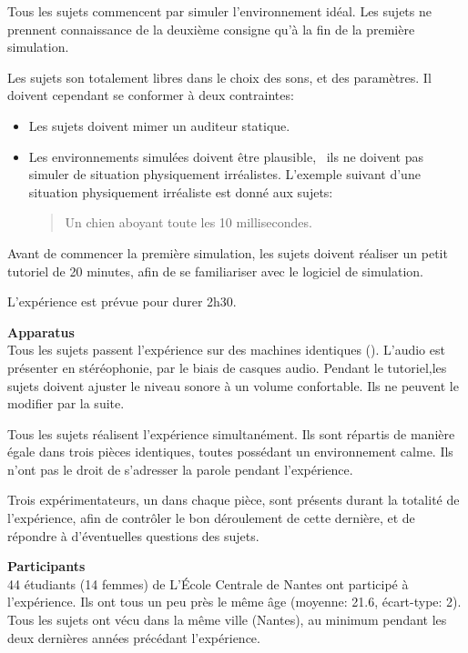 Tous les sujets commencent par simuler l'environnement idéal. Les sujets ne prennent connaissance de la deuxième consigne qu'à la fin de la première simulation.

Les sujets son totalement libres dans le choix des sons, et des paramètres. Il doivent cependant se conformer à deux contraintes:

\begin{itemize}

\item Les sujets doivent mimer un auditeur statique.
 
\item Les environnements simulées doivent être plausible, \ie~ils ne doivent pas simuler de situation physiquement irréalistes. L'exemple suivant d'une situation physiquement irréaliste est donné aux sujets: 

\begin{quote}
Un chien aboyant toute les 10 millisecondes.
\end{quote}

\end{itemize}

Avant de commencer la première simulation, les sujets doivent réaliser un petit tutoriel de 20 minutes, afin de se familiariser avec le logiciel de simulation.

L'expérience est prévue pour durer 2h30.

\textbf{Apparatus} \\

Tous les sujets passent l'expérience sur des machines identiques (). L'audio est présenter en stéréophonie, par le biais de casques audio. Pendant le tutoriel,les sujets doivent ajuster le niveau sonore à un volume confortable. Ils ne peuvent le modifier par la suite.

Tous les sujets réalisent l'expérience simultanément. Ils sont répartis de manière égale dans trois pièces identiques, toutes possédant un environnement calme. Ils n'ont pas le droit de s'adresser la parole pendant l'expérience.

Trois expérimentateurs, un dans chaque pièce, sont présents durant la totalité de l'expérience, afin de contrôler le bon déroulement de cette dernière, et de répondre à d'éventuelles questions des sujets. 

\textbf{Participants} \\

44 étudiants (14 femmes) de L’École Centrale de Nantes ont participé à l'expérience. Ils ont tous un peu près le même âge (moyenne: 21.6, écart-type: 2). Tous les sujets ont vécu dans la même ville (Nantes), au minimum pendant les deux dernières années précédant l'expérience.

